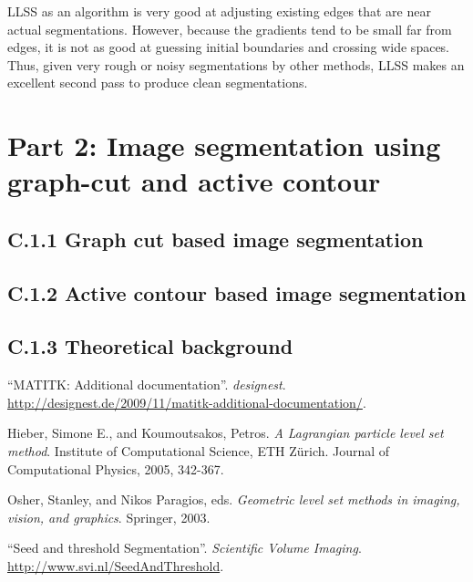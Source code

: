 \documentclass{article}
\begin{document}
LLSS as an algorithm is very good at adjusting existing edges that are near actual segmentations. However, because the gradients tend to be small far from edges, it is not as good at guessing initial boundaries and crossing wide spaces\cite{osher}. Thus, given very rough or noisy segmentations by other methods, LLSS makes an excellent second pass to produce clean segmentations.



\clearpage
\section*{Part 2: Image segmentation using graph-cut and active contour}

\subsection*{C.1.1 Graph cut based image segmentation}

\subsection*{C.1.2 Active contour based image segmentation}

\subsection*{C.1.3 Theoretical background}


\clearpage
\begin{thebibliography}{9}
\fontsize{10pt}{12pt}\selectfont
\raggedright

        ``MATITK: Additional documentation''.
        \emph{designest}.
        \url{http://designest.de/2009/11/matitk-additional-documentation/}.

        Hieber, Simone E., and Koumoutsakos, Petros.
        \emph{A Lagrangian particle level set method}.
        Institute of Computational Science, ETH Zürich.
        Journal of Computational Physics, 2005, 342-367.

        Osher, Stanley, and Nikos Paragios, eds. 
        \emph{Geometric level set methods in imaging, vision, and graphics}.
        Springer, 2003.

        ``Seed and threshold Segmentation''.
        \emph{Scientific Volume Imaging}.
        \url{http://www.svi.nl/SeedAndThreshold}.

\end{thebibliography}


\end{document}
